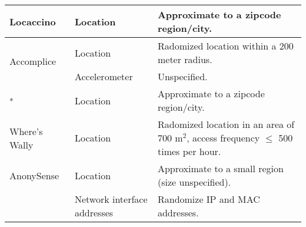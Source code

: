 \begin{table}
\begin{tabular}{|l|l|l|}
Locaccino~\cite{toch2010empirical} & Location & Approximate to a zipcode region/city.  \\ \hline

\multirow{3}{*}{Accomplice~\cite{han2012accomplice}} & \multirow{2}{*}{Location} 
& \multirow{2}{3.5cm}{Radomized location within a 200 meter radius.}  \\ 
& & \\ \cline{2-3}
& Accelerometer & Unspecified.  \\ \hline

\cite{shokri2011quantifying}\textsuperscript{*}
& Location & Approximate to a zipcode region/city.  \\ \hline

\multirow{3}{*}{Where's Wally \cite{polakis2015s}}%
& \multirow{3}{*}{Location} & \multirow{3}{3.5cm}{Radomized location 
in an area of 700 m$^2$, access frequency $\leq$ 500 times per hour.}  \\
&& \\ %
&& \\ \hline

\multirow{3}{*}{AnonySense~\cite{kapadia2008anonysense}} 
& \multirow{2}{*}{Location} & \multirow{2}{3.5cm}{Approximate to a small region (size unspecified).}  \\ 
& & \\ \cline{2-3}
& \multirow{2}{1.8cm}{Network interface addresses} & 
\multirow{2}{*}{Randomize IP and MAC addresses.}  \\
& & \\ \hline


\end{tabular}
\end{table}
